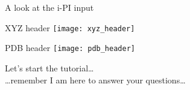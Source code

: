 \begin{frame}{A look at the i-PI input}
\begin{block}{\small XYZ header}
\vspace{1em}
\texttt{[image: xyz\_header]}
\end{block}
\vspace{2.5em}
\begin{block}{\small PDB header}
\vspace{1em}
\texttt{[image: pdb\_header]}
\end{block}
\end{frame}

\begin{frame}
Let's start the tutorial\ldots \\
\vspace{2em}
\ldots remember
I am here to answer your questions\ldots
\end{frame}

